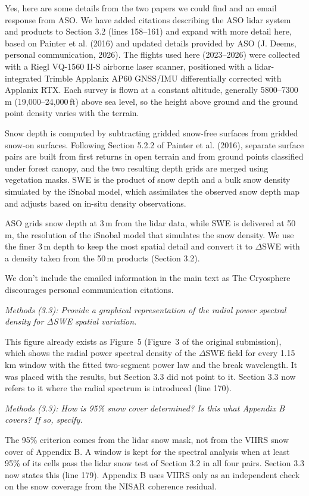 \documentclass[tc, manuscript]{copernicus}
\begin{document}
Yes, here are some details from the two papers we could find and an email response from ASO. We have added citations describing the ASO lidar system and products to Section 3.2 (lines 158--161) and expand with more detail here, based on Painter et al. (2016) and updated details provided by ASO (J. Deems, personal communication, 2026). The flights used here (2023--2026) were collected with a Riegl VQ-1560 II-S airborne laser scanner, positioned with a lidar-integrated Trimble Applanix AP60 GNSS/IMU differentially corrected with Applanix RTX. Each survey is flown at a constant altitude, generally 5800--7300\,m (19,000--24,000\,ft) above sea level, so the height above ground and the ground point density varies with the terrain.

Snow depth is computed by subtracting gridded snow-free surfaces from gridded snow-on surfaces. Following Section 5.2.2 of Painter et al. (2016), separate surface pairs are built from first returns in open terrain and from ground points classified under forest canopy, and the two resulting depth grids are merged using vegetation masks. SWE is the product of snow depth and a bulk snow density simulated by the iSnobal model, which assimilates the observed snow depth map and adjusts based on in-situ density observations.

ASO grids snow depth at 3\,m from the lidar data, while SWE is delivered at 50\,m, the resolution of the iSnobal model that simulates the snow density. We use the finer 3\,m depth to keep the most spatial detail and convert it to $\Delta$SWE with a density taken from the 50\,m products (Section 3.2).

We don't include the emailed information in the main text as The Cryosphere discourages personal communication citations.

\textit{Methods (3.3): Provide a graphical representation of the radial power spectral density for ΔSWE spatial variation.}

This figure already exists as Figure~5 (Figure~3 of the original submission), which shows the radial power spectral density of the $\Delta$SWE field for every 1.15\,km window with the fitted two-segment power law and the break wavelength. It was placed with the results, but Section 3.3 did not point to it. Section 3.3 now refers to it where the radial spectrum is introduced (line 170).

\textit{Methods (3.3): How is 95\% snow cover determined? Is this what Appendix B covers? If so, specify.}

The 95\% criterion comes from the lidar snow mask, not from the VIIRS snow cover of Appendix B. A window is kept for the spectral analysis when at least 95\% of its cells pass the lidar snow test of Section 3.2 in all four pairs. Section 3.3 now states this (line 179). Appendix B uses VIIRS only as an independent check on the snow coverage from the NISAR coherence residual.
\end{document}
